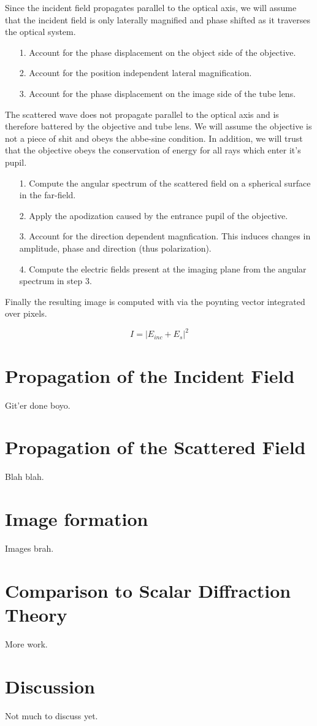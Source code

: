 Since the incident field propagates parallel to the optical axis, we will assume that the incident field is only laterally magnified and phase shifted as it traverses the optical system.
\begin{enumerate}
\item[1.] Account for the phase displacement on the object side of the objective.
\item[2.] Account for the position independent lateral magnification.
\item[3.] Account for the phase displacement on the image side of the tube lens.
\end{enumerate}
The scattered wave does not propagate parallel to the optical axis and is therefore battered by the objective and tube lens. We will assume the objective is not a piece of shit and obeys the abbe-sine condition. In addition, we will trust that the objective obeys the conservation of energy for all rays which enter it's pupil.
\begin{enumerate}
\item[1.] Compute the angular spectrum of the scattered field on a spherical surface in the far-field.
\item[2.] Apply the apodization caused by the entrance pupil of the objective.
\item[3.] Account for the direction dependent magnfication. This induces changes in amplitude, phase and direction (thus polarization).
\item[4.] Compute the electric fields present at the imaging plane from the angular spectrum in step 3.
\end{enumerate}

Finally the resulting image is computed with via the poynting vector integrated over pixels.

\begin{equation*}
  I = \left | E_{inc} + E_{s} \right |^2 
\end{equation*}

\section{Propagation of the Incident Field}
Git'er done boyo.

\section{Propagation of the Scattered Field}

Blah blah.

\section{Image formation}

Images brah.

\section{Comparison to Scalar Diffraction Theory}

More work.

\section{Discussion}

Not much to discuss yet.


